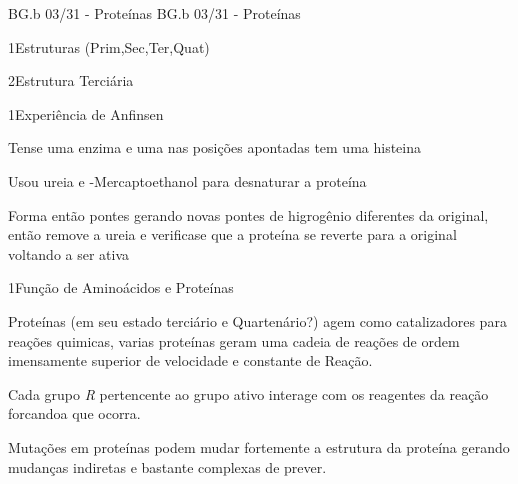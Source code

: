 \documentclass[\mainfilename]{subfiles}
\begin{document}
{BG.b 03/31 - Proteínas}
{BG.b 03/31 - Proteínas}


\begin{sectionBox}1{Estruturas (Prim,Sec,Ter,Quat)}
    
    
    
\end{sectionBox}

\begin{sectionBox}2{Estrutura Terciária}
    
    
    
\end{sectionBox}

\begin{sectionBox}1{Experiência de Anfinsen}
    
    Tense uma enzima e uma 
    nas posições apontadas tem uma histeina 

    Usou ureia e \chembeta-Mercaptoethanol para desnaturar a proteína

    Forma então pontes  gerando novas pontes de higrogênio diferentes da original, então remove a ureia e verificase que a proteína se reverte para a original voltando a ser ativa
    
\end{sectionBox}

\begin{sectionBox}1{Função de Aminoácidos e Proteínas}
    
    Proteínas (em seu estado terciário e Quartenário?) agem como catalizadores para reações quimicas, varias proteínas geram uma cadeia de reações de ordem imensamente superior de velocidade e constante de Reação.

    Cada grupo \textit{R} pertencente ao grupo ativo interage com os reagentes da reação forcandoa que ocorra.

    Mutações em proteínas podem mudar fortemente a estrutura da proteína gerando mudanças indiretas e bastante complexas de prever.
    
\end{sectionBox}
\end{document}
